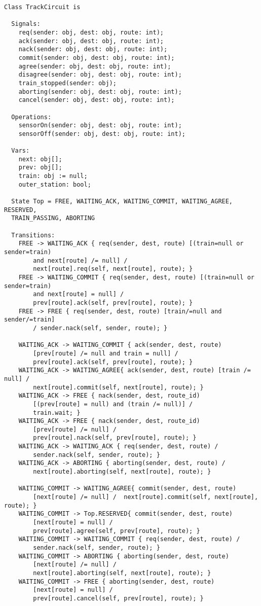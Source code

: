 \begin{lstlisting}[caption={modello della classe TrackCircuit}]
Class TrackCircuit is

  Signals:
    req(sender: obj, dest: obj, route: int);        
    ack(sender: obj, dest: obj, route: int);
    nack(sender: obj, dest: obj, route: int);
    commit(sender: obj, dest: obj, route: int);
    agree(sender: obj, dest: obj, route: int);
    disagree(sender: obj, dest: obj, route: int);
    train_stopped(sender: obj);
    aborting(sender: obj, dest: obj, route: int);
    cancel(sender: obj, dest: obj, route: int);

  Operations:
    sensorOn(sender: obj, dest: obj, route: int);
    sensorOff(sender: obj, dest: obj, route: int);

  Vars:
    next: obj[];
    prev: obj[];
    train: obj := null;
    outer_station: bool;

  State Top = FREE, WAITING_ACK, WAITING_COMMIT, WAITING_AGREE, RESERVED, 
  TRAIN_PASSING, ABORTING

  Transitions:
    FREE -> WAITING_ACK { req(sender, dest, route) [(train=null or sender=train) 
    	and next[route] /= null] /
     	next[route].req(self, next[route], route); }
    FREE -> WAITING_COMMIT { req(sender, dest, route) [(train=null or sender=train) 
    	and next[route] = null] / 
    	prev[route].ack(self, prev[route], route); }
    FREE -> FREE { req(sender, dest, route) [train/=null and sender/=train] 
    	/ sender.nack(self, sender, route); }

    WAITING_ACK -> WAITING_COMMIT { ack(sender, dest, route) 
    	[prev[route] /= null and train = null] / 
    	prev[route].ack(self, prev[route], route); }
    WAITING_ACK -> WAITING_AGREE{ ack(sender, dest, route) [train /= null] / 
    	next[route].commit(self, next[route], route); }
    WAITING_ACK -> FREE { nack(sender, dest, route_id) 
    	[(prev[route] = null) and (train /= null)] / 
    	train.wait; }
    WAITING_ACK -> FREE { nack(sender, dest, route_id) 
    	[prev[route] /= null] / 
    	prev[route].nack(self, prev[route], route); }
    WAITING_ACK -> WAITING_ACK { req(sender, dest, route) / 
    	sender.nack(self, sender, route); }
    WAITING_ACK -> ABORTING { aborting(sender, dest, route) / 
    	next[route].aborting(self, next[route], route); }

    WAITING_COMMIT -> WAITING_AGREE{ commit(sender, dest, route) 
    	[next[route] /= null] /  next[route].commit(self, next[route], route); }
    WAITING_COMMIT -> Top.RESERVED{ commit(sender, dest, route) 
    	[next[route] = null] / 
    	prev[route].agree(self, prev[route], route); }
    WAITING_COMMIT -> WAITING_COMMIT { req(sender, dest, route) / 
    	sender.nack(self, sender, route); }
    WAITING_COMMIT -> ABORTING { aborting(sender, dest, route) 
    	[next[route] /= null] / 
    	next[route].aborting(self, next[route], route); }
    WAITING_COMMIT -> FREE { aborting(sender, dest, route) 
    	[next[route] = null] / 
    	prev[route].cancel(self, prev[route], route); }


\end{lstlisting}
